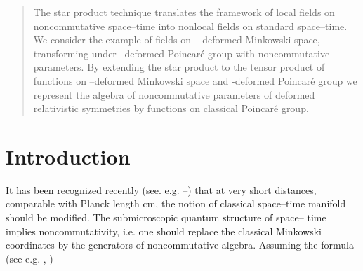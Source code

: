 \documentclass[a4paper,12pt]{article}
\begin{document}
\date{}                                                                                 
\maketitle                                                                              
                                                                                        
\begin{abstract}
The star product technique  translates the framework of local
fields on noncommutative  space--time into nonlocal fields on 
standard
 space--time. We consider the example of fields on \myHighlight{$\kappa$}\coordHE{}--
deformed Minkowski
 space, transforming under \myHighlight{$\kappa$}\coordHE{}--deformed Poincar\'{e} group 
with
 noncommutative parameters. By extending the star product to the
 tensor product of functions on \myHighlight{$\kappa$}\coordHE{}--deformed
 Minkowski space and \myHighlight{$\kappa$}\coordHE{}-deformed
 Poincar\'{e}  group we represent the algebra of noncommutative 
parameters of
 deformed relativistic symmetries
 by functions on classical Poincar\'{e} group.
\end{abstract}




\section{Introduction}
\label{lucsec1}

It has been recognized recently (see. e.g.
\cite{rluk1}--\cite{rluk3})
  that at very short distances, comparable with Planck length
 \coordHE{}cm, the notion of classical space--time 
manifold should
 be modified. The submicroscopic quantum structure of space--
time implies
 noncommutativity, i.e. one should replace   the classical  
Minkowski coordinates
 \coordHE{} by the generators \coordHE{} of 
noncommutative algebra.
 Assuming the formula (see e.g.
   \cite{rluk4}, \cite{rluk5})\myHighlight{$^{[1]}$}\coordHE{}
\end{document}
